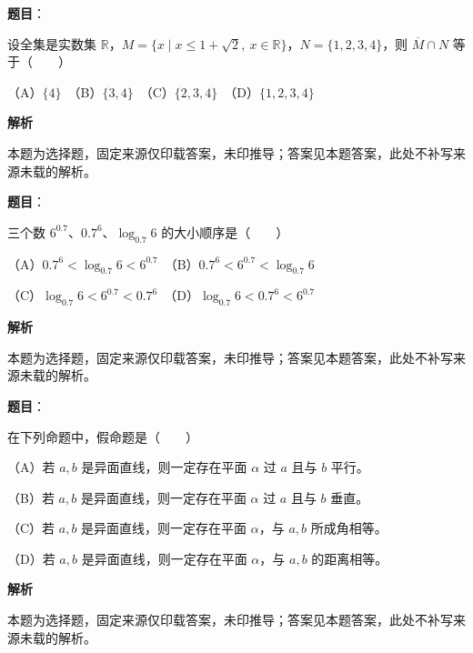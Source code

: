 

\begin{answer}

\textbf{题目}：

设全集是实数集 $\mathbb R$，$M=\{x\mid x\le 1+\sqrt2,\ x\in\mathbb R\}$，$N=\{1,2,3,4\}$，则 $\overline M\cap N$ 等于\mbox{（　　）}

（A）$\{4\}$　（B）$\{3,4\}$　（C）$\{2,3,4\}$　（D）$\{1,2,3,4\}$

\textbf{解析}

本题为选择题，固定来源仅印载答案，未印推导；答案见本题答案，此处不补写来源未载的解析。


\end{answer}
\begin{answer}

\textbf{题目}：

三个数 $6^{0.7}$、$0.7^6$、$\log_{0.7}6$ 的大小顺序是\mbox{（　　）}

（A）$0.7^6<\log_{0.7}6<6^{0.7}$　（B）$0.7^6<6^{0.7}<\log_{0.7}6$

（C）$\log_{0.7}6<6^{0.7}<0.7^6$　（D）$\log_{0.7}6<0.7^6<6^{0.7}$

\textbf{解析}

本题为选择题，固定来源仅印载答案，未印推导；答案见本题答案，此处不补写来源未载的解析。


\end{answer}
\begin{answer}

\textbf{题目}：

在下列命题中，假命题是\mbox{（　　）}

（A）若 $a,b$ 是异面直线，则一定存在平面 $\alpha$ 过 $a$ 且与 $b$ 平行。

（B）若 $a,b$ 是异面直线，则一定存在平面 $\alpha$ 过 $a$ 且与 $b$ 垂直。

（C）若 $a,b$ 是异面直线，则一定存在平面 $\alpha$，与 $a,b$ 所成角相等。

（D）若 $a,b$ 是异面直线，则一定存在平面 $\alpha$，与 $a,b$ 的距离相等。

\textbf{解析}

本题为选择题，固定来源仅印载答案，未印推导；答案见本题答案，此处不补写来源未载的解析。


\end{answer}
